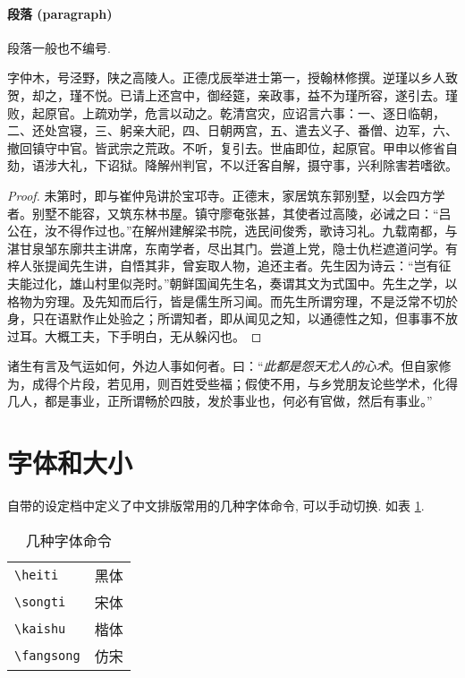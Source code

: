 	\paragraph{段落 (paragraph)} 段落一般也不编号.
	\begin{corollary}[吕柟]
		字仲木，号泾野，陕之高陵人。正德戊辰举进士第一，授翰林修撰。逆瑾以乡人致贺，却之，瑾不悦。已请上还宫中，御经筵，亲政事，益不为瑾所容，遂引去。瑾败，起原官。上疏劝学，危言以动之。乾清宫灾，应诏言六事：一、逐日临朝，二、还处宫寝，三、躬亲大祀，四、日朝两宫，五、遣去义子、番僧、边军，六、撤回镇守中官。皆武宗之荒政。不听，复引去。世庙即位，起原官。甲申以修省自劾，语涉大礼，下诏狱。降解州判官，不以迁客自解，摄守事，兴利除害若嗜欲。
	\end{corollary}
	\begin{proof}
		未第时，即与崔仲凫讲於宝邛寺。正德末，家居筑东郭别墅，以会四方学者。别墅不能容，又筑东林书屋。镇守廖奄张甚，其使者过高陵，必诫之曰：“吕公在，汝不得作过也。”在解州建解梁书院，选民间俊秀，歌诗习礼。九载南都，与湛甘泉邹东廓共主讲席，东南学者，尽出其门。尝道上党，隐士仇栏遮道问学。有梓人张提闻先生讲，自悟其非，曾妄取人物，追还主者。先生因为诗云：“岂有征夫能过化，雄山村里似尧时。”朝鲜国闻先生名，奏谓其文为式国中。先生之学，以格物为穷理。及先知而后行，皆是儒生所习闻。而先生所谓穷理，不是泛常不切於身，只在语默作止处验之；所谓知者，即从闻见之知，以通德性之知，但事事不放过耳。大概工夫，下手明白，无从躲闪也。
	\end{proof}

	\begin{remark}
		诸生有言及气运如何，外边人事如何者。曰：“\emph{此都是怨天尤人的心术}。但自家修为，成得个片段，若见用，则百姓受些福；假使不用，与乡党朋友论些学术，化得几人，都是事业，正所谓畅於四肢，发於事业也，何必有官做，然后有事业。” 
	\end{remark}

	\section{字体和大小}
	自带的设定档中定义了中文排版常用的几种字体命令, 可以手动切换. 如表 \ref{table:ziti}.
	\begin{table}[h!]
		\begin{tabular}{ll}
			\texttt{\textbackslash heiti} & {\heiti 黑体} \\
			\texttt{\textbackslash songti} & {\songti 宋体} \\
			\texttt{\textbackslash kaishu} & {\kaishu 楷体} \\
			\texttt{\textbackslash fangsong} & {\fangsong 仿宋}
		\end{tabular}
		\caption{几种字体命令} \label{table:ziti}
	\end{table}

